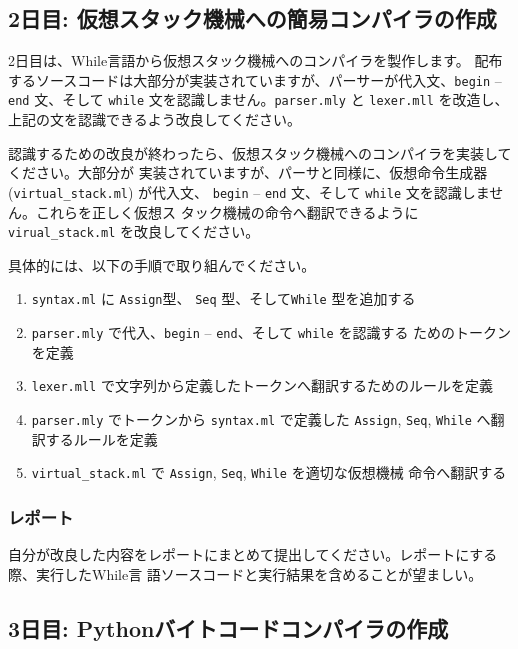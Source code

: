 \documentclass[a4paper,11pt]{jsarticle}
\begin{document}
\subsection{2日目: 仮想スタック機械への簡易コンパイラの作成}

2日目は、While言語から仮想スタック機械へのコンパイラを製作します。
配布するソースコードは大部分が実装されていますが、パーサーが代入文、\verb|begin| --
\verb|end| 文、そして \verb|while| 文を認識しません。\verb|parser.mly| と \verb|lexer.mll|
を改造し、上記の文を認識できるよう改良してください。

認識するための改良が終わったら、仮想スタック機械へのコンパイラを実装してください。大部分が
実装されていますが、パーサと同様に、仮想命令生成器 (\verb|virtual_stack.ml|) が代入文、
\verb|begin| -- \verb|end| 文、そして \verb|while| 文を認識しません。これらを正しく仮想ス
タック機械の命令へ翻訳できるように \verb|virual_stack.ml| を改良してください。

具体的には、以下の手順で取り組んでください。

\begin{enumerate}
\item \verb|syntax.ml| に \verb|Assign|型、 \verb|Seq| 型、そして\verb|While| 型を追加する
\item \verb|parser.mly| で代入、\verb|begin| -- \verb|end|、そして \verb|while| を認識する
  ためのトークンを定義
\item \verb|lexer.mll| で文字列から定義したトークンへ翻訳するためのルールを定義
\item \verb|parser.mly| でトークンから \verb|syntax.ml| で定義した \verb|Assign|,
  \verb|Seq|, \verb|While| へ翻訳するルールを定義
\item \verb|virtual_stack.ml| で \verb|Assign|, \verb|Seq|, \verb|While| を適切な仮想機械
  命令へ翻訳する
\end{enumerate}

\subsubsection{レポート}

自分が改良した内容をレポートにまとめて提出してください。レポートにする際、実行したWhile言
語ソースコードと実行結果を含めることが望ましい。


\subsection{3日目: Pythonバイトコードコンパイラの作成}
\end{document}
